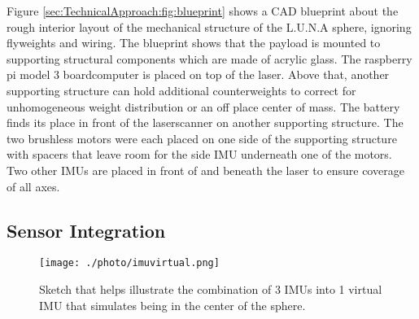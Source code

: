 Figure \ref{sec:TechnicalApproach:fig:blueprint} shows a CAD blueprint about the rough interior layout of the mechanical structure of the L.U.N.A sphere, ignoring flyweights and wiring. The blueprint shows that the payload is mounted to supporting structural components which are made of acrylic glass. The raspberry pi model 3 boardcomputer is placed on top of the laser. Above that, another supporting structure can hold additional counterweights to correct for unhomogeneous weight distribution or an off place center of mass.                                                                                                     
The battery finds its place in front of the laserscanner on another supporting structure. The two brushless motors were each placed on one side of the supporting structure with spacers that leave room for the side IMU underneath one of the motors. Two other IMUs are placed in front of and beneath the laser to ensure coverage of all axes.                                                                                 
                                                                                                                                                                                                                  
\subsection{Sensor Integration}                                                                                                                                                                                   
\label{sec:TechnicalApproach:SensorIntegration}

\begin{figure}                                                                                                                                                                                                    
\centering
\texttt{[image: ./photo/imuvirtual.png]}                                                                                                                                                      
\caption{Sketch that helps illustrate the combination of 3 IMUs into 1 virtual IMU that simulates being in the center of the sphere.}                                                                                                                           
\label{sec:SensorIntegration:fig:virtual}                                                                                                                                                                       
\end{figure}                                                                                                                                                                                                      

